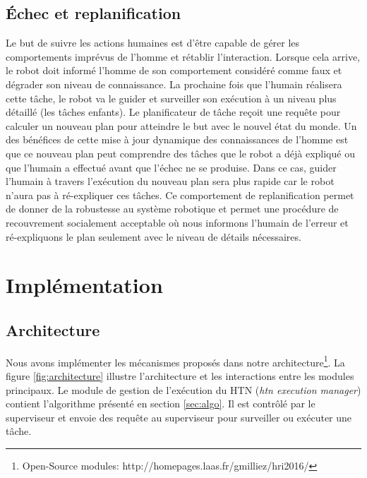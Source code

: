 \documentclass[a4paper,11pt,twoside]{StyleThese}
\begin{document}
\subsection{Échec et replanification}

Le but de suivre les actions humaines est d'être capable de gérer les comportements imprévus de l'homme et rétablir l'interaction. Lorsque cela arrive, le robot doit informé l'homme de son comportement considéré comme faux et dégrader son niveau de connaissance. La prochaine fois que l'humain réalisera cette tâche, le robot va le guider et surveiller son exécution à un niveau plus détaillé (les tâches enfants).
Le planificateur de tâche reçoit une requête pour calculer un nouveau plan pour atteindre le but avec le nouvel état du monde. 
Un des bénéfices de cette mise à jour dynamique des connaissances de l'homme est que ce nouveau plan peut comprendre des tâches que le robot a déjà expliqué ou que l'humain a effectué avant que l'échec ne se produise. Dans ce cas, guider l'humain à travers l'exécution du nouveau plan sera plus rapide car le robot n'aura pas à ré-expliquer ces tâches.
Ce comportement de replanification permet de donner de la robustesse au système robotique et permet une procédure de recouvrement socialement acceptable où nous informons l'humain de l'erreur et ré-expliquons le plan seulement avec le niveau de détails nécessaires.





\section{Implémentation}
\subsection{Architecture}
Nous avons implémenter les mécanismes proposés dans notre architecture\footnote{Open-Source modules: http://homepages.laas.fr/gmilliez/hri2016/}. La figure \ref{fig:architecture} illustre l'architecture et les interactions entre les modules principaux.
Le module de gestion de l'exécution du HTN (\textit{htn execution manager}) contient l'algorithme présenté en section \ref{sec:algo}.
Il est contrôlé par le superviseur et envoie des requête au superviseur pour surveiller ou exécuter une tâche.
\end{document}
